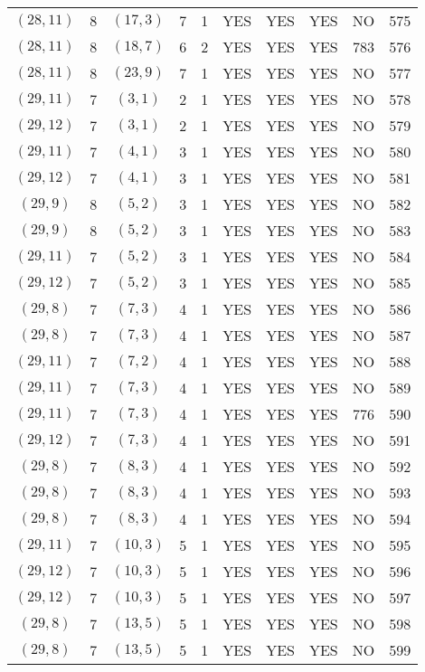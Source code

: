\begin{longtable}{|c|c|c|c|c|c|c|c|c|c|}
$(28, 11)$ & 8 & $(17, 3)$ & 7 & 1 & YES & YES & YES & NO & 575\\
$(28, 11)$ & 8 & $(18, 7)$ & 6 & 2 & YES & YES & YES & 783 & 576\\
$(28, 11)$ & 8 & $(23, 9)$ & 7 & 1 & YES & YES & YES & NO & 577\\
$(29, 11)$ & 7 & $(3, 1)$ & 2 & 1 & YES & YES & YES & NO & 578\\
$(29, 12)$ & 7 & $(3, 1)$ & 2 & 1 & YES & YES & YES & NO & 579\\
$(29, 11)$ & 7 & $(4, 1)$ & 3 & 1 & YES & YES & YES & NO & 580\\
$(29, 12)$ & 7 & $(4, 1)$ & 3 & 1 & YES & YES & YES & NO & 581\\
$(29, 9)$ & 8 & $(5, 2)$ & 3 & 1 & YES & YES & YES & NO & 582\\
$(29, 9)$ & 8 & $(5, 2)$ & 3 & 1 & YES & YES & YES & NO & 583\\
$(29, 11)$ & 7 & $(5, 2)$ & 3 & 1 & YES & YES & YES & NO & 584\\
$(29, 12)$ & 7 & $(5, 2)$ & 3 & 1 & YES & YES & YES & NO & 585\\
$(29, 8)$ & 7 & $(7, 3)$ & 4 & 1 & YES & YES & YES & NO & 586\\
$(29, 8)$ & 7 & $(7, 3)$ & 4 & 1 & YES & YES & YES & NO & 587\\
$(29, 11)$ & 7 & $(7, 2)$ & 4 & 1 & YES & YES & YES & NO & 588\\
$(29, 11)$ & 7 & $(7, 3)$ & 4 & 1 & YES & YES & YES & NO & 589\\
$(29, 11)$ & 7 & $(7, 3)$ & 4 & 1 & YES & YES & YES & 776 & 590\\
$(29, 12)$ & 7 & $(7, 3)$ & 4 & 1 & YES & YES & YES & NO & 591\\
$(29, 8)$ & 7 & $(8, 3)$ & 4 & 1 & YES & YES & YES & NO & 592\\
$(29, 8)$ & 7 & $(8, 3)$ & 4 & 1 & YES & YES & YES & NO & 593\\
$(29, 8)$ & 7 & $(8, 3)$ & 4 & 1 & YES & YES & YES & NO & 594\\
$(29, 11)$ & 7 & $(10, 3)$ & 5 & 1 & YES & YES & YES & NO & 595\\
$(29, 12)$ & 7 & $(10, 3)$ & 5 & 1 & YES & YES & YES & NO & 596\\
$(29, 12)$ & 7 & $(10, 3)$ & 5 & 1 & YES & YES & YES & NO & 597\\
$(29, 8)$ & 7 & $(13, 5)$ & 5 & 1 & YES & YES & YES & NO & 598\\
$(29, 8)$ & 7 & $(13, 5)$ & 5 & 1 & YES & YES & YES & NO & 599\\

\end{longtable}
